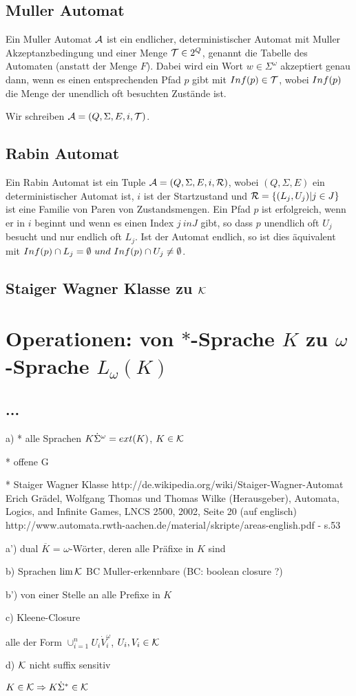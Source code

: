 \subsection{Muller Automat}
Ein Muller Automat $\mathcal{A}$ ist ein endlicher, deterministischer Automat mit Muller Akzeptanzbedingung und einer Menge $\mathcal{T} \in 2^Q$, genannt die Tabelle des Automaten (anstatt der Menge $F$). Dabei wird ein Wort $w \in \Sigma^\omega$ akzeptiert genau dann, wenn es einen entsprechenden Pfad $p$ gibt mit ${Inf}(p) \in \mathcal{T}$, wobei ${Inf}(p)$ die Menge der unendlich oft besuchten Zustände ist.

Wir schreiben $\mathcal{A} = (Q, \Sigma, E, i, \mathcal{T})$.

\subsection{Rabin Automat}
Ein Rabin Automat ist ein Tuple $\mathcal{A} = (Q, \Sigma, E, i, \mathcal{R})$, wobei $(Q,\Sigma,E)$ ein deterministischer Automat ist, $i$ ist der Startzustand und $\mathcal{R} = \{(L_j, U_j) | j \in J\}$ ist eine Familie von Paren von Zustandsmengen. Ein Pfad $p$ ist erfolgreich, wenn er in $i$ beginnt und wenn es einen Index $j \ in J$ gibt, so dass $p$ unendlich oft $U_j$ besucht und nur endlich oft $L_j$. Ist der Automat endlich, so ist dies äquivalent mit
${Inf}(p) \cap L_j = \emptyset \ und \ {Inf}(p) \cap U_j \neq \emptyset$.

\subsection{Staiger Wagner Klasse zu $\mathcal{K}$}

\section{Operationen: von $*$-Sprache $K$ zu $\omega$-Sprache $L_\omega (K)$}
\subsection{...}
a)
* alle Sprachen $K \dot \Sigma^\omega = ext(K)$, $K \in \mathcal{K}$

* offene G

* Staiger Wagner Klasse
http://de.wikipedia.org/wiki/Staiger-Wagner-Automat
Erich Grädel, Wolfgang Thomas und Thomas Wilke (Herausgeber), Automata, Logics, and Infinite Games, LNCS 2500, 2002, Seite 20 (auf englisch)
http://www.automata.rwth-aachen.de/material/skripte/areas-english.pdf - s.53

a')
dual $\overline{K}$ = $\omega$-Wörter, deren alle Präfixe in $K$ sind

b) Sprachen $\lim \mathcal{K}$
BC Muller-erkennbare
(BC: boolean closure ?)

b') von einer Stelle an alle Prefixe in $K$

c) Kleene-Closure

alle der Form $\cup_{i=1}^n U_i \dot V_i^\omega$, $U_i, V_i \in \mathcal{K}$

d) $\mathcal{K}$ nicht suffix sensitiv

$K \in \mathcal{K} \Rightarrow K \dot \Sigma^* \in \mathcal{K}$  
